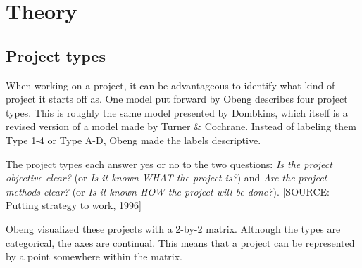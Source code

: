 \chapter{Theory}

\section{Project types}
When working on a project, it can be advantageous to identify what kind of project it starts off as. One model put forward by Obeng describes four project types. This is roughly the same model presented by Dombkins, which itself is a revised version of a model made by Turner \& Cochrane. Instead of labeling them Type 1-4 or Type A-D, Obeng made the labels descriptive.

The project types each answer yes or no to the two questions: \textit{Is the project objective clear?} (or \textit{Is it known WHAT the project is?}) and \textit{Are the project methods clear?} (or \textit{Is it known HOW the project will be done?}). [SOURCE: Putting strategy to work, 1996]

\begin{table}[H]
\caption{Turner \& Cochrane, Dombkins and Obeng described the same type of project differently.}
\label{obengtable}
\end{table}

Obeng visualized these projects with a 2-by-2 matrix. Although the types are categorical, the axes are continual. This means that a project can be represented by a point somewhere within the matrix.

